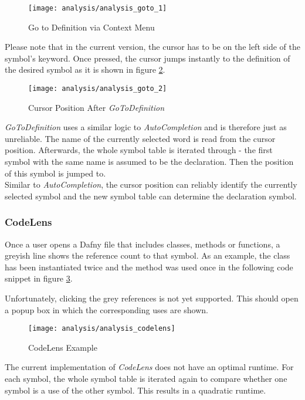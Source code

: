 \begin{figure}[H]
    \centering
    \texttt{[image: analysis/analysis\_goto\_1]}
    \caption{Go to Definition via Context Menu}
    \label{fig:analysis_goto_1}
\end{figure}

Please note that in the current version, the cursor has to be on the left side of the symbol's keyword.
Once pressed, the cursor jumps instantly to the definition of the desired symbol as it is shown in figure \ref{fig:analysis_goto_2}.

\begin{figure}[H]
    \centering
    \texttt{[image: analysis/analysis\_goto\_2]}
    \caption{Cursor Position After \textit{GoToDefinition}}
    \label{fig:analysis_goto_2}
\end{figure}

\textit{GoToDefinition} uses a similar logic to \textit{AutoCompletion} and is therefore just as unreliable.
The name of the currently selected word is read from the cursor position.
Afterwards, the whole symbol table is iterated through - the first symbol with the same name is assumed to be the declaration.
Then the position of this symbol is jumped to. \\

Similar to \textit{AutoCompletion}, the cursor position can reliably identify the currently selected symbol and the new symbol table can determine the declaration symbol.

\subsubsection{CodeLens}
Once a user opens a Dafny file that includes classes, methods or functions, a greyish line shows the reference count to that symbol.
As an example, the class  has been instantiated twice and the method  was used once in the following code snippet in figure \ref{fig:analysis_codelens}.

Unfortunately, clicking the grey references is not yet supported.
This should open a popup box in which the corresponding uses are shown.

\begin{figure}[H]
    \centering
    \texttt{[image: analysis/analysis\_codelens]}
    \caption{CodeLens Example}
    \label{fig:analysis_codelens}
\end{figure}

The current implementation of \textit{CodeLens} does not have an optimal runtime.
For each symbol, the whole symbol table is iterated again to compare whether one symbol is a use of the other symbol.
This results in a quadratic runtime. \\

